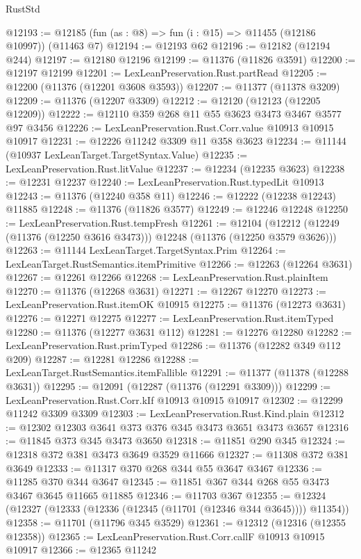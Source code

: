 \begin{lexlean}{RustStd}
\begin{coremodule}
{\begin{coremodule}
{{{{{{{{{{{{{{{{{{{{{{{{{{{{{{{{{{{{{{{{{{{{{{{{{{{{{{{{{{{{{{{{{{{{{{{{{{{{{{{{{{{{{@12193 := @12185 (fun (as : @8) => fun (i : @15) => @11455 (@12186 @10997)) (@11463 @7)
@12194 := @12193 @62
@12196 := @12182 (@12194 @244)
@12197 := @12180 @12196
@12199 := @11376 (@11826 @3591)
@12200 := @12197 @12199
@12201 := LexLeanPreservation.Rust.partRead
@12205 := @12200 (@11376 (@12201 @3608 @3593))
@12207 := @11377 (@11378 @3209)
@12209 := @11376 (@12207 @3309)
@12212 := @12120 (@12123 (@12205 @12209))
@12222 := @12110 @359 @268 @11 @55 @3623 @3473 @3467 @3577 @97 @3456
@12226 := LexLeanPreservation.Rust.Corr.value @10913 @10915 @10917
@12231 := @12226 @11242 @3309 @11 @358 @3623
@12234 := @11144 (@10937 LexLeanTarget.TargetSyntax.Value)
@12235 := LexLeanPreservation.Rust.litValue
@12237 := @12234 (@12235 @3623)
@12238 := @12231 @12237
@12240 := LexLeanPreservation.Rust.typedLit @10913
@12243 := @11376 (@12240 @358 @11)
@12246 := @12222 (@12238 @12243) @11885
@12248 := @11376 (@11826 @3577)
@12249 := @12246 @12248
@12250 := LexLeanPreservation.Rust.tempFresh
@12261 := @12104
    (@12212 (@12249 (@11376 (@12250 @3616 @3473))) @12248 (@11376 (@12250 @3579 @3626)))
@12263 := @11144 LexLeanTarget.TargetSyntax.Prim
@12264 := LexLeanTarget.RustSemantics.itemPrimitive
@12266 := @12263 (@12264 @3631)
@12267 := @12261 @12266
@12268 := LexLeanPreservation.Rust.plainItem
@12270 := @11376 (@12268 @3631)
@12271 := @12267 @12270
@12273 := LexLeanPreservation.Rust.itemOK @10915
@12275 := @11376 (@12273 @3631)
@12276 := @12271 @12275
@12277 := LexLeanPreservation.Rust.itemTyped
@12280 := @11376 (@12277 @3631 @112)
@12281 := @12276 @12280
@12282 := LexLeanPreservation.Rust.primTyped
@12286 := @11376 (@12282 @349 @112 @209)
@12287 := @12281 @12286
@12288 := LexLeanTarget.RustSemantics.itemFallible
@12291 := @11377 (@11378 (@12288 @3631))
@12295 := @12091 (@12287 (@11376 (@12291 @3309)))
@12299 := LexLeanPreservation.Rust.Corr.kIf @10913 @10915 @10917
@12302 := @12299 @11242 @3309 @3309
@12303 := LexLeanPreservation.Rust.Kind.plain
@12312 := @12302 @12303 @3641 @373 @376 @345 @3473 @3651 @3473 @3657
@12316 := @11845 @373 @345 @3473 @3650
@12318 := @11851 @290 @345
@12324 := @12318 @372 @381 @3473 @3649 @3529 @11666
@12327 := @11308 @372 @381 @3649
@12333 := @11317 @370 @268 @344 @55 @3647 @3467
@12336 := @11285 @370 @344 @3647
@12345 := @11851 @367 @344 @268 @55 @3473 @3467 @3645 @11665 @11885
@12346 := @11703 @367
@12355 := @12324 (@12327 (@12333 (@12336 (@12345 (@11701 (@12346 @344 @3645)))) @11354))
@12358 := @11701 (@11796 @345 @3529)
@12361 := @12312 (@12316 (@12355 @12358))
@12365 := LexLeanPreservation.Rust.Corr.callF @10913 @10915 @10917
@12366 := @12365 @11242
}}}}}}}}}}}}}}}}}}}}}}}}}}}}}}}}}}}}}}}}}}}}}}}}}}}}}}}}}}}}}}}}}}}}}}}}}}}}}}}}}}}}}
\end{coremodule}}
\end{coremodule}
\end{lexlean}

